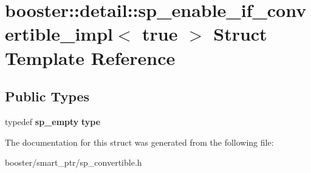 \section{booster\-:\-:detail\-:\-:sp\-\_\-enable\-\_\-if\-\_\-convertible\-\_\-impl$<$ true $>$ Struct Template Reference}
\label{structbooster_1_1detail_1_1sp__enable__if__convertible__impl_3_01true_01_4}
\subsection*{Public Types}
\begin{DoxyCompactItemize}
\item 
typedef {\bf sp\-\_\-empty} {\bfseries type}\label{structbooster_1_1detail_1_1sp__enable__if__convertible__impl_3_01true_01_4_a77e77502ef1d78384dd43603333cb058}

\end{DoxyCompactItemize}


The documentation for this struct was generated from the following file\-:\begin{DoxyCompactItemize}
\item 
booster/smart\-\_\-ptr/sp\-\_\-convertible.\-h\end{DoxyCompactItemize}
